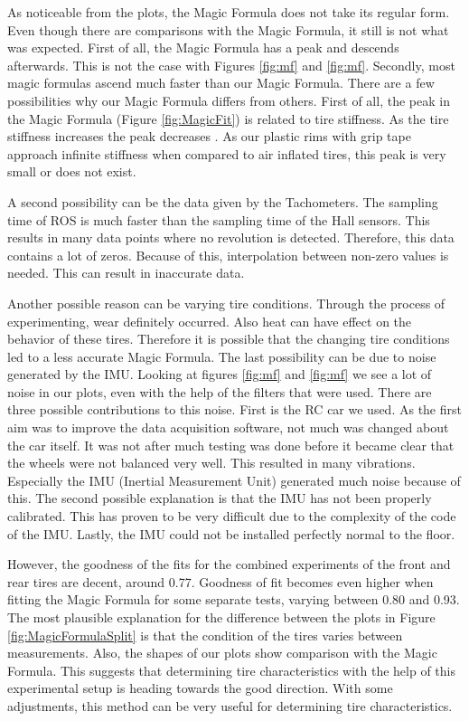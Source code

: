 As noticeable from the plots, the Magic Formula does not take its regular form. Even though there are comparisons with the Magic Formula, it still is not what was expected. First of all, the Magic Formula has a peak and descends afterwards. This is not the case with Figures \ref{fig:mf} and \ref{fig:mf}. Secondly, most magic formulas ascend much faster than our Magic Formula. 
	There are a few possibilities why our Magic Formula differs from others. First of all, the peak in the Magic Formula (Figure \ref{fig:MagicFit}) is related to tire stiffness. As the tire stiffness increases the peak decreases \cite{Jonson}. As our plastic rims with grip tape approach infinite stiffness when compared to air inflated tires, this peak is very small or does not exist. 
    
A second possibility can be the data given by the Tachometers. The sampling time of ROS is much faster than the sampling time of the Hall sensors. This results in many data points where no revolution is detected. Therefore, this data contains a lot of zeros.  Because of this, interpolation between non-zero values is needed. This can result in inaccurate data.
    
Another possible reason  can be varying tire conditions. Through the process of experimenting, wear definitely occurred. Also heat can have effect on the behavior of these tires. Therefore it is possible that the changing tire conditions led to a less accurate Magic Formula. 
The last possibility can be due to noise generated by the IMU. Looking at figures \ref{fig:mf} and \ref{fig:mf} we see a lot of noise in our plots, even with the help of the filters that were used. There are three possible contributions to this noise. First is the RC car we used. As the first aim was to improve the data acquisition software, not much was changed about the car itself. It was not after much testing was done before it became clear that the wheels were not balanced very well. This resulted in many vibrations. Especially the IMU (Inertial Measurement Unit) generated much noise because of this. The second possible explanation is that the IMU has not been properly calibrated. This has proven to be very difficult due to the complexity of the code of the IMU. Lastly, the IMU could not be installed perfectly normal to the floor.

However, the goodness of the fits for the combined experiments of the front and rear tires are decent, around 0.77. Goodness of fit becomes even higher when fitting the Magic Formula for some separate tests, varying between 0.80 and 0.93. The most plausible explanation for the difference between the plots in Figure \ref{fig:MagicFormulaSplit} is that the condition of the tires varies between measurements. Also, the shapes of our plots show comparison with the Magic Formula. This suggests that determining tire characteristics with the help of this experimental setup is heading towards the good direction. With some adjustments, this method can be very useful for determining tire characteristics.

